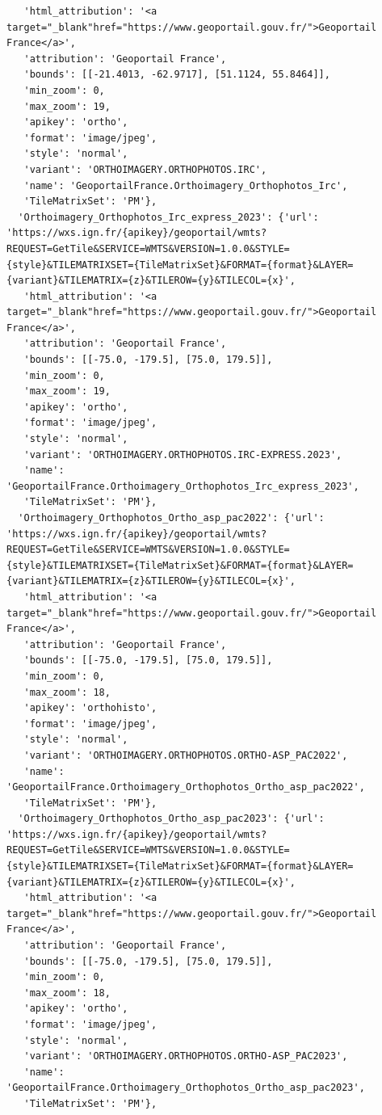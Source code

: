 \documentclass[
  letterpaper,
  DIV=11,
  numbers=noendperiod]{scrreprt}
\begin{document}
\begin{verbatim}
   'html_attribution': '<a target="_blank"href="https://www.geoportail.gouv.fr/">Geoportail France</a>',
   'attribution': 'Geoportail France',
   'bounds': [[-21.4013, -62.9717], [51.1124, 55.8464]],
   'min_zoom': 0,
   'max_zoom': 19,
   'apikey': 'ortho',
   'format': 'image/jpeg',
   'style': 'normal',
   'variant': 'ORTHOIMAGERY.ORTHOPHOTOS.IRC',
   'name': 'GeoportailFrance.Orthoimagery_Orthophotos_Irc',
   'TileMatrixSet': 'PM'},
  'Orthoimagery_Orthophotos_Irc_express_2023': {'url': 'https://wxs.ign.fr/{apikey}/geoportail/wmts?REQUEST=GetTile&SERVICE=WMTS&VERSION=1.0.0&STYLE={style}&TILEMATRIXSET={TileMatrixSet}&FORMAT={format}&LAYER={variant}&TILEMATRIX={z}&TILEROW={y}&TILECOL={x}',
   'html_attribution': '<a target="_blank"href="https://www.geoportail.gouv.fr/">Geoportail France</a>',
   'attribution': 'Geoportail France',
   'bounds': [[-75.0, -179.5], [75.0, 179.5]],
   'min_zoom': 0,
   'max_zoom': 19,
   'apikey': 'ortho',
   'format': 'image/jpeg',
   'style': 'normal',
   'variant': 'ORTHOIMAGERY.ORTHOPHOTOS.IRC-EXPRESS.2023',
   'name': 'GeoportailFrance.Orthoimagery_Orthophotos_Irc_express_2023',
   'TileMatrixSet': 'PM'},
  'Orthoimagery_Orthophotos_Ortho_asp_pac2022': {'url': 'https://wxs.ign.fr/{apikey}/geoportail/wmts?REQUEST=GetTile&SERVICE=WMTS&VERSION=1.0.0&STYLE={style}&TILEMATRIXSET={TileMatrixSet}&FORMAT={format}&LAYER={variant}&TILEMATRIX={z}&TILEROW={y}&TILECOL={x}',
   'html_attribution': '<a target="_blank"href="https://www.geoportail.gouv.fr/">Geoportail France</a>',
   'attribution': 'Geoportail France',
   'bounds': [[-75.0, -179.5], [75.0, 179.5]],
   'min_zoom': 0,
   'max_zoom': 18,
   'apikey': 'orthohisto',
   'format': 'image/jpeg',
   'style': 'normal',
   'variant': 'ORTHOIMAGERY.ORTHOPHOTOS.ORTHO-ASP_PAC2022',
   'name': 'GeoportailFrance.Orthoimagery_Orthophotos_Ortho_asp_pac2022',
   'TileMatrixSet': 'PM'},
  'Orthoimagery_Orthophotos_Ortho_asp_pac2023': {'url': 'https://wxs.ign.fr/{apikey}/geoportail/wmts?REQUEST=GetTile&SERVICE=WMTS&VERSION=1.0.0&STYLE={style}&TILEMATRIXSET={TileMatrixSet}&FORMAT={format}&LAYER={variant}&TILEMATRIX={z}&TILEROW={y}&TILECOL={x}',
   'html_attribution': '<a target="_blank"href="https://www.geoportail.gouv.fr/">Geoportail France</a>',
   'attribution': 'Geoportail France',
   'bounds': [[-75.0, -179.5], [75.0, 179.5]],
   'min_zoom': 0,
   'max_zoom': 18,
   'apikey': 'ortho',
   'format': 'image/jpeg',
   'style': 'normal',
   'variant': 'ORTHOIMAGERY.ORTHOPHOTOS.ORTHO-ASP_PAC2023',
   'name': 'GeoportailFrance.Orthoimagery_Orthophotos_Ortho_asp_pac2023',
   'TileMatrixSet': 'PM'},

\end{verbatim}
\end{document}
